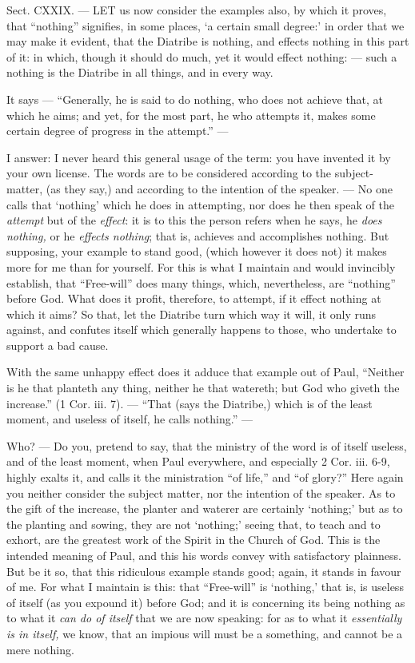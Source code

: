 Sect. CXXIX. — LET us now consider the examples also, by which it proves, that “nothing” signifies, in some places, ‘a certain small degree:’ in order that we may make it evident, that the Diatribe is nothing, and effects nothing in this part of it: in which, though it should do much, yet it would effect nothing: — such a nothing is the Diatribe in all things, and in every way.

It says — “Generally, he is said to do nothing, who does not achieve that, at which he aims; and yet, for the most part, he who attempts it, makes some certain degree of progress in the attempt.” —

I answer: I never heard this general usage of the term: you have invented it by your own license. The words are to be considered according to the subject-matter, (as they say,) and according to the intention of the speaker. — No one calls that ‘nothing’ which he does in attempting, nor does he then speak of the \emph{attempt }but of the \emph{effect}: it is to this the person refers when he says, he \emph{does nothing, }or he \emph{effects nothing}; that is, achieves and accomplishes nothing. But supposing, your example to stand good, (which however it does not) it makes more for me than for yourself. For this is what I maintain and would invincibly establish, that “Free-will” does many things, which, nevertheless, are “nothing” before God. What does it profit, therefore, to attempt, if it effect nothing at which it aims? So that, let the Diatribe turn which way it will, it only runs against, and confutes itself which generally happens to those, who undertake to support a bad cause.

With the same unhappy effect does it adduce that example out of Paul, “Neither is he that planteth any thing, neither he that watereth; but God who giveth the increase.” (1 Cor. iii. 7). — “That (says the Diatribe,) which is of the least moment, and useless of itself, he calls nothing.” —

Who? — Do you, pretend to say, that the ministry of the word is of itself useless, and of the least moment, when Paul everywhere, and especially 2 Cor. iii. 6-9, highly exalts it, and calls it the ministration “of life,” and “of glory?” Here again you neither consider the subject matter, nor the intention of the speaker. As to the gift of the increase, the planter and waterer are certainly ‘nothing;’ but as to the planting and sowing, they are not ‘nothing;’ seeing that, to teach and to exhort, are the greatest work of the Spirit in the Church of God. This is the intended meaning of Paul, and this his words convey with satisfactory plainness. But be it so, that this ridiculous example stands good; again, it stands in favour of me. For what I maintain is this: that “Free-will” is ‘nothing,’ that is, is useless of itself (as you expound it) before God; and it is concerning its being nothing as to what it \emph{can do of itself }that we are now speaking: for as to what it \emph{essentially is in itself, }we know, that an impious will must be a something, and cannot be a mere nothing.

